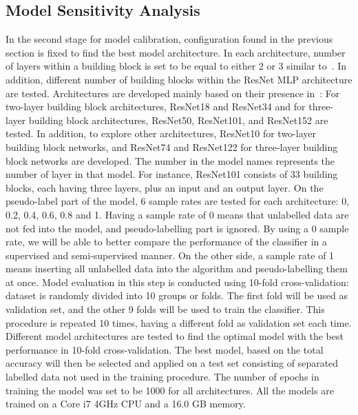  \subsection{Model Sensitivity Analysis}
 In the second stage for model calibration, configuration found in the previous section is fixed to find the best model architecture. In each architecture, number of layers within a building block is set to be equal to either 2 or 3 similar to~\cite{he2016deep}. In addition, different number of building blocks within the ResNet MLP architecture are tested. Architectures are developed mainly based on their presence in~\cite{he2016deep}: For two-layer building block architectures, ResNet18 and ResNet34 and for three-layer building block architectures, ResNet50, ResNet101, and ResNet152 are tested. In addition, to explore other architectures, ResNet10 for two-layer building block networks, and ResNet74 and ResNet122 for three-layer building block networks are developed. The number in the model names represents the number of layer in that model. For instance, ResNet101 consists of 33 building blocks, each having three layers, plus an input and an output layer. On the pseudo-label part of the model, 6 sample rates are tested for each architecture: 0, 0.2, 0.4, 0.6, 0.8 and 1. Having a sample rate of 0 means that unlabelled data are not fed into the model, and pseudo-labelling part is ignored. By using a 0 sample rate, we will be able to better compare the performance of the classifier in a supervised and semi-supervised manner. On the other side, a sample rate of 1 means inserting all unlabelled data into the algorithm and pseudo-labelling them at once.  Model evaluation in this step is conducted using 10-fold cross-validation: dataset is randomly divided into 10 groups or folds. The first fold will be used as validation set, and the other 9 folds will be used to train the classifier. This procedure is repeated 10 times, having a different fold as validation set each time. Different model architectures are tested to find the optimal model with the best performance in 10-fold cross-validation. The best model, based on the total accuracy will then be selected and applied on a test set consisting of separated labelled data not used in the training procedure.   The number of epochs in training the model was set to be 1000 for all architectures. All the models are trained on a Core i7 4GHz CPU and a 16.0 GB memory.  
 
